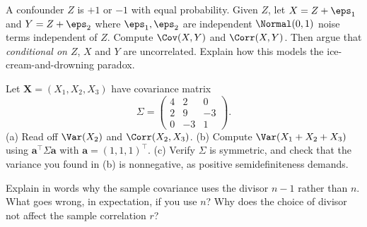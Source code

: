 \begin{exercise}
\label{ch14:ex-confound}
A confounder $Z$ is $+1$ or $-1$ with equal probability. Given $Z$, let
$X = Z + \eps_1$ and $Y = Z + \eps_2$ where $\eps_1, \eps_2$ are independent
$\Normal(0, 1)$ noise terms independent of $Z$. Compute $\Cov(X, Y)$ and
$\Corr(X, Y)$. Then argue that \emph{conditional on $Z$}, $X$ and $Y$ are
uncorrelated. Explain how this models the ice-cream-and-drowning paradox.
\end{exercise}

\begin{exercise}
\label{ch14:ex-matrix}
Let $\mathbf{X} = (X_1, X_2, X_3)$ have covariance matrix
\[
\Sigma = \begin{pmatrix} 4 & 2 & 0 \\ 2 & 9 & -3 \\ 0 & -3 & 1 \end{pmatrix}.
\]
(a) Read off $\Var(X_2)$ and $\Corr(X_2, X_3)$. (b) Compute $\Var(X_1 + X_2 + X_3)$
using $\mathbf{a}^\top \Sigma \mathbf{a}$ with $\mathbf{a} = (1,1,1)^\top$.
(c) Verify $\Sigma$ is symmetric, and check that the variance you found in (b) is
nonnegative, as positive semidefiniteness demands.
\end{exercise}

\begin{exercise}
\label{ch14:ex-bessel}
Explain in words why the sample covariance uses the divisor $n - 1$ rather than $n$.
What goes wrong, in expectation, if you use $n$? Why does the choice of divisor not
affect the sample correlation $r$?
\end{exercise}
